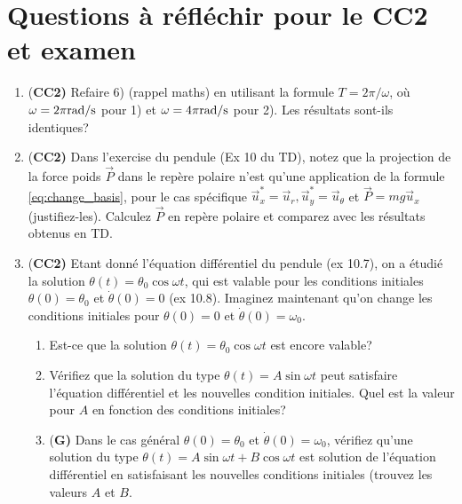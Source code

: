 \documentclass[french,12pt]{article}
\begin{document}
\section*{Questions à réfléchir pour le CC2 et examen}
\begin{enumerate}

\item {(\bf CC2)} Refaire 6) (rappel maths) en utilisant la formule $T = 2\pi/\omega$, où $\omega = 2 \pi {\rm rad/s}$ pour 1) et $\omega = 4 \pi {\rm rad/s}$ pour 2). Les résultats sont-ils identiques?

\item  {(\bf CC2)} Dans l'exercise du pendule (Ex 10 du TD), notez que la projection de la force poids $\vec{P}$ dans le repère polaire n'est qu'une application de la formule \eqref{eq:change_basis}, pour le cas spécifique $\vec{u}_x^* = \vec{u}_r, \vec{u}_y^* = \vec{u}_{\theta}$ et $\vec{P} = mg \vec{u}_x$ (justifiez-les). Calculez $\vec{P}$ en repère polaire et comparez avec les résultats obtenus en TD.


\item {(\bf CC2)} Etant donné l'équation différentiel du pendule (ex 10.7), on a étudié la solution $\theta(t) = \theta_0 \cos \omega t$, qui est valable pour les conditions initiales $\theta(0) = \theta_0$ et $\dot{\theta}(0) = 0$ (ex 10.8). Imaginez maintenant qu'on change les conditions initiales pour $\theta(0) = 0$ et $\dot{\theta}(0) = \omega_0$.
\begin{enumerate}
\item Est-ce que la solution $\theta(t) = \theta_0 \cos \omega t$ est encore valable?
\item Vérifiez que la solution du type $\theta(t) = A \sin \omega t$ peut satisfaire l'équation différentiel et les nouvelles condition initiales. Quel est la valeur pour $A$ en fonction des conditions initiales? 
\item {(\bf G)} Dans le cas général $\theta(0) = \theta_0$ et $\dot{\theta}(0) = \omega_0$, vérifiez qu'une solution du type $\theta(t) = A \sin \omega t + B \cos \omega t$ est solution de l'équation différentiel en satisfaisant les nouvelles conditions initiales (trouvez les valeurs $A$ et $B$. 

\end{enumerate}


\end{enumerate}
\end{document}
